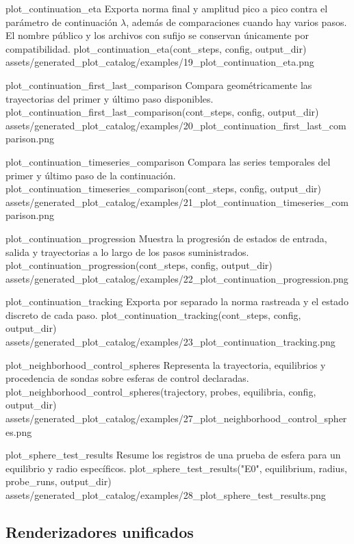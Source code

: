 \plotcatalogentry
  {plot_continuation_eta}
  {Exporta norma final y amplitud pico a pico contra el parámetro de
  continuación \(\lambda\), además de comparaciones cuando hay varios pasos.
  El nombre público y los archivos con sufijo  se conservan
  únicamente por compatibilidad.}
  {plot_continuation_eta(cont_steps, config, output_dir)}
  {assets/generated_plot_catalog/examples/19_plot_continuation_eta.png}

\plotcatalogentry
  {plot_continuation_first_last_comparison}
  {Compara geométricamente las trayectorias del primer y último paso
  disponibles.}
  {plot_continuation_first_last_comparison(cont_steps, config, output_dir)}
  {assets/generated_plot_catalog/examples/20_plot_continuation_first_last_comparison.png}

\plotcatalogentry
  {plot_continuation_timeseries_comparison}
  {Compara las series temporales del primer y último paso de la continuación.}
  {plot_continuation_timeseries_comparison(cont_steps, config, output_dir)}
  {assets/generated_plot_catalog/examples/21_plot_continuation_timeseries_comparison.png}

\plotcatalogentry
  {plot_continuation_progression}
  {Muestra la progresión de estados de entrada, salida y trayectorias a lo
  largo de los pasos suministrados.}
  {plot_continuation_progression(cont_steps, config, output_dir)}
  {assets/generated_plot_catalog/examples/22_plot_continuation_progression.png}

\plotcatalogentry
  {plot_continuation_tracking}
  {Exporta por separado la norma rastreada y el estado discreto de cada paso.}
  {plot_continuation_tracking(cont_steps, config, output_dir)}
  {assets/generated_plot_catalog/examples/23_plot_continuation_tracking.png}

\plotcatalogentry
  {plot_neighborhood_control_spheres}
  {Representa la trayectoria, equilibrios y procedencia de sondas sobre
  esferas de control declaradas.}
  {plot_neighborhood_control_spheres(trajectory, probes, equilibria, config, output_dir)}
  {assets/generated_plot_catalog/examples/27_plot_neighborhood_control_spheres.png}

\plotcatalogentry
  {plot_sphere_test_results}
  {Resume los registros de una prueba de esfera para un equilibrio y radio
  específicos.}
  {plot_sphere_test_results("E0", equilibrium, radius, probe_runs, output_dir)}
  {assets/generated_plot_catalog/examples/28_plot_sphere_test_results.png}

\subsection{Renderizadores unificados}

